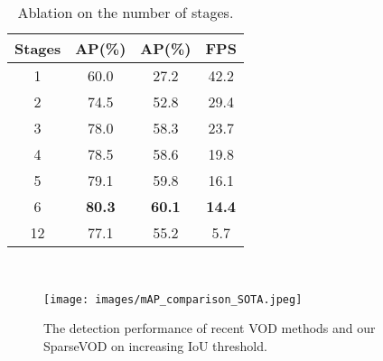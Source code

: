 \documentclass{bmvc2k}
\begin{document}
\begin{minipage}{\linewidth}
\begin{minipage}{0.35\linewidth}
    \vspace{-10pt}
    \hspace{-10pt}
  \begin{table}[H]
    \small
    \begin{tabular}{c|ccc}
        \toprule
        Stages & AP(\%) & AP(\%) & FPS\\
        \hline
        1 & 60.0 & 27.2 & 42.2\\
        2 & 74.5 & 52.8 & 29.4\\
        3 & 78.0 & 58.3 & 23.7\\
        4 & 78.5 & 58.6 & 19.8\\
        5 & 79.1 & 59.8 & 16.1\\
        {6} & \textbf{80.3} & \textbf{60.1} & \textbf{14.4}\\
        12 & 77.1 & 55.2 & 5.7\\
        \bottomrule
  \end{tabular}\\
  \vspace{-5pt}
  \caption{Ablation on the number of stages.}
  \label{subtab:stages}
  \end{table}
  \end{minipage}
  \hspace{0.05\linewidth}
  \begin{minipage}{0.5\linewidth}
  \vspace{-10pt}

      \begin{figure}[H]
        \texttt{[image: images/mAP\_comparison\_SOTA.jpeg]}
        \vspace{-20pt}
        \caption{The detection performance of recent VOD methods and our SparseVOD on increasing IoU threshold.}
        \label{fig:high_quality_AP}
    \end{figure}
  \end{minipage}
\end{minipage}
\end{document}
